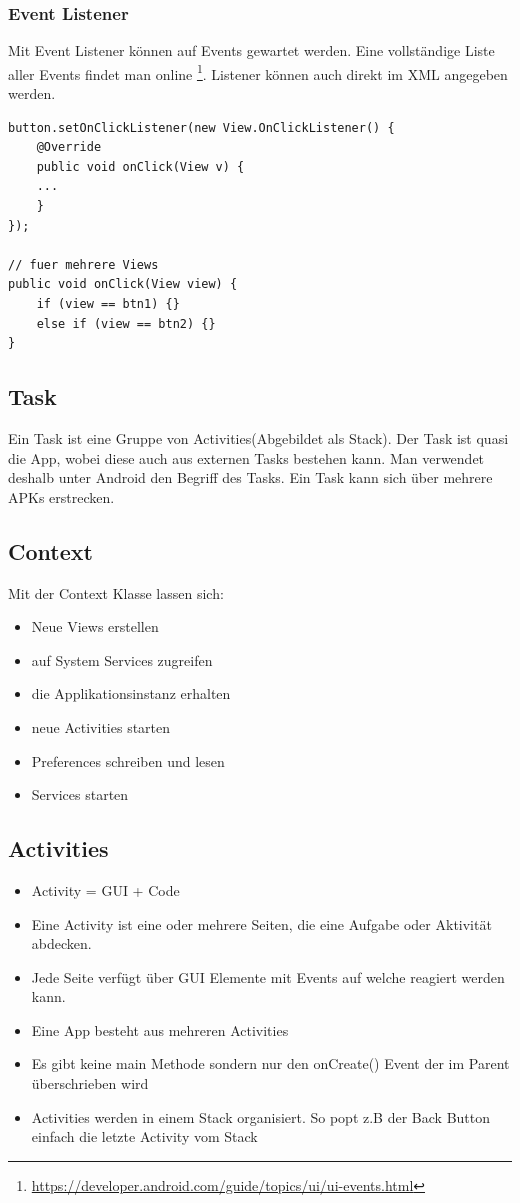 \subsubsection{Event Listener}
Mit Event Listener können auf Events gewartet werden. Eine vollständige Liste aller Events findet man online \footnote{\url{https://developer.android.com/guide/topics/ui/ui-events.html}}. Listener können auch direkt im XML angegeben werden.

\begin{lstlisting}[caption=Event Listener]
button.setOnClickListener(new View.OnClickListener() {
	@Override
	public void onClick(View v) {
	...
	}
});

// fuer mehrere Views
public void onClick(View view) {
	if (view == btn1) {}
	else if (view == btn2) {}
}
\end{lstlisting}


\subsection{Task}
Ein Task ist eine Gruppe von Activities(Abgebildet als Stack). Der Task ist quasi die App, wobei diese auch aus externen Tasks bestehen kann. Man verwendet deshalb unter Android den Begriff des Tasks. Ein Task kann sich über mehrere APKs erstrecken.


\subsection{Context}
Mit der Context Klasse lassen sich:
\begin{itemize}
	\item Neue Views erstellen
	\item auf System Services zugreifen
	\item die Applikationsinstanz erhalten
	\item neue Activities starten
	\item Preferences schreiben und lesen
	\item Services starten
\end{itemize}

\subsection{Activities}
\begin{itemize}
	\item Activity = GUI + Code
	\item Eine Activity ist eine oder mehrere Seiten, die eine Aufgabe oder Aktivität abdecken.
	\item Jede Seite verfügt über GUI Elemente mit Events auf welche reagiert werden kann.
	\item Eine App besteht aus mehreren Activities
	\item Es gibt keine main Methode sondern nur den onCreate() Event der im Parent überschrieben wird
	\item Activities werden in einem Stack organisiert. So popt z.B der Back Button einfach die letzte Activity vom Stack
\end{itemize}

